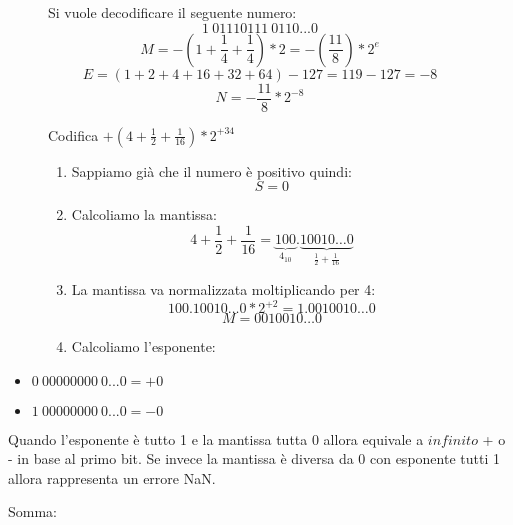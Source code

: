 \documentclass[a4paper]{article}
\theoremstyle{break}
\theoremstyle{break}
\theoremstyle{break}
\theoremstyle{break}
\begin{document}
\begin{figure}[H]
	\begin{example}
		Si vuole decodificare il seguente numero:
		\[1\:01110111\:0110...0\]
		\[M = -(1+\frac{1}{4}+\frac{1}{4})*2 = -(\frac{11}{8})*2^{e}\]
		\[E = (1+2+4+16+32+64)-127=119-127=-8\]
		\[N = -\frac{11}{8} * 2^{-8}\]
	\end{example}
\end{figure}

\begin{figure}[H]
	\begin{example}
		Codifica $+(4+\frac{1}{2}+\frac{1}{16})*2^{+34}$
       \begin{enumerate}
        \item Sappiamo già che il numero è positivo quindi:
            \[
            S=0
            \] 
            \item Calcoliamo la mantissa:
                \[
                    4+\frac{1}{2}+\frac{1}{16}= \underbrace{100}_{4_{10}}.
                    \underbrace{10010 \ldots 0}_{\frac{1}{2}+\frac{1}{16}}
                \] 
                \item La mantissa va normalizzata moltiplicando per 4:
                \[
                    100.10010 \ldots 0 * 2^{+2} = 1.0010010 \ldots 0
                \]
                \[
                M = 0010010 \ldots 0
                \] 
            \item Calcoliamo l'esponente:
       \end{enumerate} 
	\end{example}
\end{figure}

\begin{itemize}
	\item $0\:00000000\:0...0 = +0$
	\item $1\:00000000\:0...0 = -0$
\end{itemize}

Quando l'esponente è tutto 1 e la mantissa tutta 0 allora equivale a $infinito$
+ o - in base al primo bit. Se invece la mantissa è diversa da 0 con esponente tutti 1
allora rappresenta un errore NaN.

Somma:\\
\label{es2}


\end{document}
